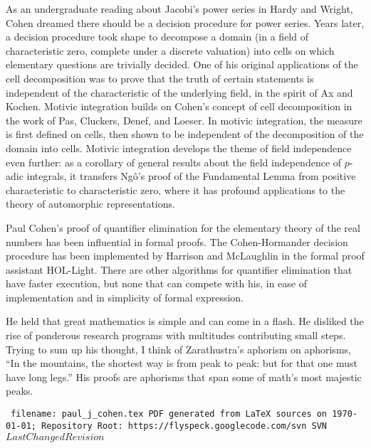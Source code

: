 \documentclass{llncs}
\def\svninfo{{\tt
  filename: paul\_j\_cohen.tex\hfill\break
  PDF generated from LaTeX sources on \today; \hfill\break
  Repository Root: https://flyspeck.googlecode.com/svn \hfill\break
  SVN $LastChangedRevision$
  }
  }
\begin{document}
\smallskip



As an undergraduate reading about Jacobi's power series in Hardy and Wright, Cohen dreamed there should be 
a decision procedure for power series.   Years later, a decision procedure took 
shape to decompose a domain (in a field of characteristic zero, complete under a discrete valuation) into 
cells on which elementary questions are trivially decided.
One of his original applications of the
cell decomposition was to prove that the truth of certain statements is independent of the characteristic of the underlying field, in the spirit of Ax and Kochen.
Motivic integration builds on Cohen's concept of cell decomposition in the work of Pas, Cluckers, Denef, and Loeser.  In motivic integration, the measure is first defined on cells, then shown to be independent of the decomposition of the domain into cells.  
Motivic integration develops the theme of field independence even further: as a corollary of general results about the field independence of $p$-adic integrals, it transfers Ng\^o's proof of the Fundamental Lemma  from positive characteristic to characteristic zero, where it has profound applications to the theory of automorphic representations.

Paul Cohen's proof of quantifier elimination for the elementary theory of the real numbers has been influential
in formal proofs.  The
Cohen-Hormander decision procedure has been implemented by
Harrison and McLaughlin
in the formal proof assistant HOL-Light.  There are other algorithms for
quantifier elimination that have faster execution, but none that can compete with his, in ease of implementation and in simplicity of formal expression. 


He held that great
mathematics is simple and can come in a flash.
He disliked the rise of ponderous research programs with multitudes contributing
small steps.
Trying to sum up his thought, I think of Zarathustra's aphorism on aphorisms, ``In the mountains, the shortest way is from peak to peak: but for that one must have long legs.''  His proofs are aphorisms that span some of math's most
majestic peaks.  

\bigskip
\noindent
\svninfo
\end{document}
